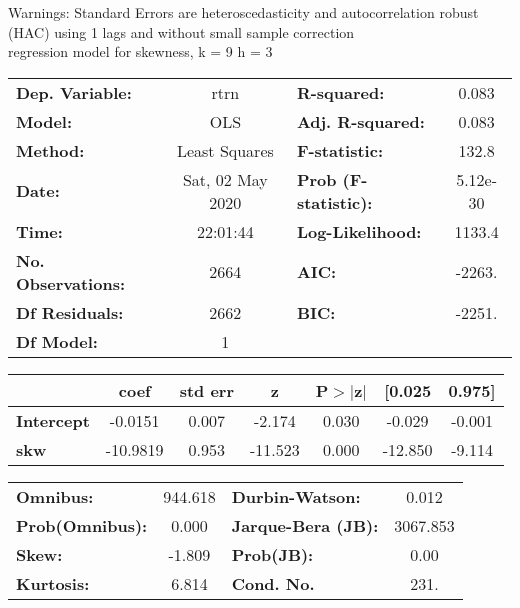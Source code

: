Warnings: \newline
 [1] Standard Errors are heteroscedasticity and autocorrelation robust (HAC) using 1 lags and without small sample correction\\ 

regression model for skewness, k = 9 h = 3\begin{center}
\begin{tabular}{lclc}
\toprule
\textbf{Dep. Variable:}    &       rtrn       & \textbf{  R-squared:         } &     0.083   \\
\textbf{Model:}            &       OLS        & \textbf{  Adj. R-squared:    } &     0.083   \\
\textbf{Method:}           &  Least Squares   & \textbf{  F-statistic:       } &     132.8   \\
\textbf{Date:}             & Sat, 02 May 2020 & \textbf{  Prob (F-statistic):} &  5.12e-30   \\
\textbf{Time:}             &     22:01:44     & \textbf{  Log-Likelihood:    } &    1133.4   \\
\textbf{No. Observations:} &        2664      & \textbf{  AIC:               } &    -2263.   \\
\textbf{Df Residuals:}     &        2662      & \textbf{  BIC:               } &    -2251.   \\
\textbf{Df Model:}         &           1      & \textbf{                     } &             \\
\bottomrule
\end{tabular}
\begin{tabular}{lcccccc}
                   & \textbf{coef} & \textbf{std err} & \textbf{z} & \textbf{P$> |$z$|$} & \textbf{[0.025} & \textbf{0.975]}  \\
\midrule
\textbf{Intercept} &      -0.0151  &        0.007     &    -2.174  &         0.030        &       -0.029    &       -0.001     \\
\textbf{skw}       &     -10.9819  &        0.953     &   -11.523  &         0.000        &      -12.850    &       -9.114     \\
\bottomrule
\end{tabular}
\begin{tabular}{lclc}
\textbf{Omnibus:}       & 944.618 & \textbf{  Durbin-Watson:     } &    0.012  \\
\textbf{Prob(Omnibus):} &   0.000 & \textbf{  Jarque-Bera (JB):  } & 3067.853  \\
\textbf{Skew:}          &  -1.809 & \textbf{  Prob(JB):          } &     0.00  \\
\textbf{Kurtosis:}      &   6.814 & \textbf{  Cond. No.          } &     231.  \\
\bottomrule
\end{tabular}
\end{center}

